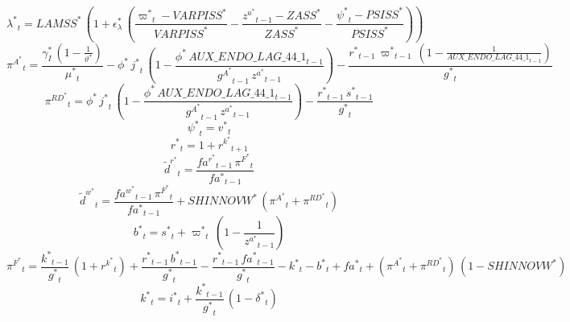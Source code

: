 \begin{dmath}
{{\lambda^*}}_{t}={{LAMSS^*}}\, \left(1+{{\epsilon_{\lambda}^*}}\, \left(\frac{{{\varpi^*}}_{t}-{{VARPISS^*}}}{{{VARPISS^*}}}-\frac{{{z^a^*}}_{t-1}-{{ZASS^*}}}{{{ZASS^*}}}-\frac{{{\psi^*}}_{t}-{{PSISS^*}}}{{{PSISS^*}}}\right)\right)
\end{dmath}
\begin{dmath}
{{\pi^A^*}}_{t}=\frac{{{\gamma_I^*}}\, \left(1-\frac{1}{{{\vartheta^*}}}\right)}{{{\mu^*}}_{t}}-{{\phi^*}}\, {{j^*}}_{t}\, \left(1-\frac{{{\phi^*}}\, {AUX\_ENDO\_LAG\_44\_1}_{t-1}}{{{g^A^*}}_{t-1}\, {{z^a^*}}_{t-1}}\right)-\frac{{{r^*}}_{t-1}\, {{\varpi^*}}_{t-1}\, \left(1-\frac{1}{{AUX\_ENDO\_LAG\_44\_1}_{t-1}}\right)}{{{g^*}}_{t}}
\end{dmath}
\begin{dmath}
{{\pi^{RD}^*}}_{t}={{\phi^*}}\, {{j^*}}_{t}\, \left(1-\frac{{{\phi^*}}\, {AUX\_ENDO\_LAG\_44\_1}_{t-1}}{{{g^A^*}}_{t-1}\, {{z^a^*}}_{t-1}}\right)-\frac{{{r^*}}_{t-1}\, {{s^*}}_{t-1}}{{{g^*}}_{t}}
\end{dmath}
\begin{dmath}
{{\psi^*}}_{t}={{v^*}}_{t}
\end{dmath}
\begin{dmath}
{{r^*}}_{t}=1+{{r^k^*}}_{t+1}
\end{dmath}
\begin{dmath}
{\tilde{d}^r^*}_{t}=\frac{{{fa^r^*}}_{t-1}\, {{\pi^F^*}}_{t}}{{{fa^*}}_{t-1}}
\end{dmath}
\begin{dmath}
{\tilde{d}^w^*}_{t}=\frac{{{fa^w^*}}_{t-1}\, {{\pi^F^*}}_{t}}{{{fa^*}}_{t-1}}+{{SHINNOVW^*}}\, \left({{\pi^A^*}}_{t}+{{\pi^{RD}^*}}_{t}\right)
\end{dmath}
\begin{dmath}
{{b^*}}_{t}={{s^*}}_{t}+{{\varpi^*}}_{t}\, \left(1-\frac{1}{{{z^a^*}}_{t-1}}\right)
\end{dmath}
\begin{dmath}
{{\pi^F^*}}_{t}=\frac{{{k^*}}_{t-1}}{{{g^*}}_{t}}\, \left(1+{{r^k^*}}_{t}\right)+\frac{{{r^*}}_{t-1}\, {{b^*}}_{t-1}}{{{g^*}}_{t}}-\frac{{{r^*}}_{t-1}\, {{fa^*}}_{t-1}}{{{g^*}}_{t}}-{{k^*}}_{t}-{{b^*}}_{t}+{{fa^*}}_{t}+\left({{\pi^A^*}}_{t}+{{\pi^{RD}^*}}_{t}\right)\, \left(1-{{SHINNOVW^*}}\right)
\end{dmath}
\begin{dmath}
{{k^*}}_{t}={{i^*}}_{t}+\frac{{{k^*}}_{t-1}}{{{g^*}}_{t}}\, \left(1-{{\delta^*}}_{t}\right)
\end{dmath}
